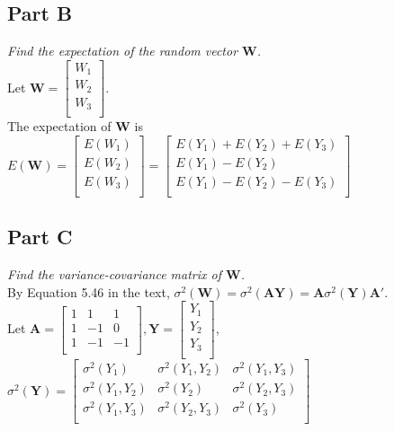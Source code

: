\documentclass[12pt, letterpaper]{article}
\begin{document}
\subsection{Part B}
\textit{Find the expectation of the random vector $\textbf{W}$.} \\

Let $\textbf{W} = \begin{bmatrix}
 W_{1} \\
 W_{2} \\
 W_{3} \\
\end{bmatrix}$. \\

The expectation of $\textbf{W}$ is $E(\textbf{W}) = \begin{bmatrix}
 E(W_{1}) \\
 E(W_{2}) \\
 E(W_{3}) \\
\end{bmatrix} = \begin{bmatrix}
E(Y_{1}) + E(Y_{2}) + E(Y_{3}) \\
E(Y_{1}) - E(Y_{2}) \\
E(Y_{1}) - E(Y_{2}) - E(Y_{3}) \\
\end{bmatrix}$

\subsection{Part C}
\textit{Find the variance-covariance matrix of $\textbf{W}$.} \\

By Equation 5.46 in the text, $\sigma^{2}(\textbf{W}) = \sigma^{2}(\textbf{A}\textbf{Y})=\textbf{A}\sigma^{2}(\textbf{Y})\textbf{A}'$. \\

Let $\textbf{A} = \begin{bmatrix}
 1 & 1 & 1 \\
 1 & -1 & 0 \\
 1 & -1 & -1 \\
\end{bmatrix} , \textbf{Y} = \begin{bmatrix}
 Y_{1} \\
 Y_{2} \\
 Y_{3} \\
\end{bmatrix}$, $\sigma^{2}(\textbf{Y}) = \begin{bmatrix}
\sigma ^2 (Y_1) & \sigma ^2 (Y_1, Y_2) & \sigma ^2 (Y_1,Y_3) \\
 \sigma ^2 (Y_1 ,Y_2) & \sigma ^2 (Y_2) & \sigma ^2 (Y_2, Y_3) \\
 \sigma ^2 (Y_1, Y_3) & \sigma ^2 (Y_2 ,Y_3) & \sigma ^2 (Y_3) \\
 \end{bmatrix}$ \\\\
 
\end{document}
